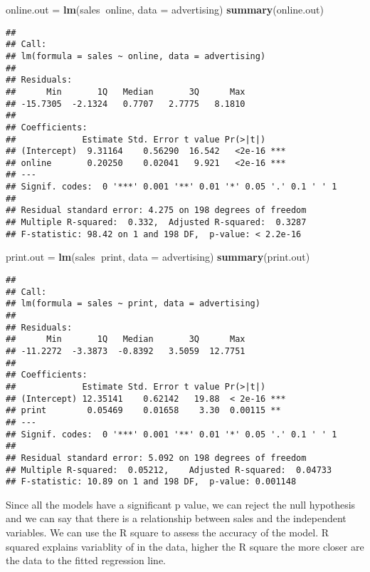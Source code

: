 \documentclass[
]{article}
\newenvironment{Shaded}{\begin{snugshade}}{\end{snugshade}}
\newcommand{\DataTypeTok}[1]{\textcolor[rgb]{0.13,0.29,0.53}{#1}}
\newcommand{\KeywordTok}[1]{\textcolor[rgb]{0.13,0.29,0.53}{\textbf{#1}}}
\newcommand{\NormalTok}[1]{#1}
\newcommand{\OperatorTok}[1]{\textcolor[rgb]{0.81,0.36,0.00}{\textbf{#1}}}
\newcommand{\StringTok}[1]{\textcolor[rgb]{0.31,0.60,0.02}{#1}}
\begin{document}
\begin{Shaded}
\begin{Highlighting}[]
\NormalTok{online.out =}\StringTok{ }\KeywordTok{lm}\NormalTok{(sales}\OperatorTok{~}\NormalTok{online, }\DataTypeTok{data =}\NormalTok{ advertising)}
\KeywordTok{summary}\NormalTok{(online.out)}
\end{Highlighting}
\end{Shaded}

\begin{verbatim}
## 
## Call:
## lm(formula = sales ~ online, data = advertising)
## 
## Residuals:
##      Min       1Q   Median       3Q      Max 
## -15.7305  -2.1324   0.7707   2.7775   8.1810 
## 
## Coefficients:
##             Estimate Std. Error t value Pr(>|t|)    
## (Intercept)  9.31164    0.56290  16.542   <2e-16 ***
## online       0.20250    0.02041   9.921   <2e-16 ***
## ---
## Signif. codes:  0 '***' 0.001 '**' 0.01 '*' 0.05 '.' 0.1 ' ' 1
## 
## Residual standard error: 4.275 on 198 degrees of freedom
## Multiple R-squared:  0.332,  Adjusted R-squared:  0.3287 
## F-statistic: 98.42 on 1 and 198 DF,  p-value: < 2.2e-16
\end{verbatim}

\begin{Shaded}
\begin{Highlighting}[]
\NormalTok{print.out =}\StringTok{ }\KeywordTok{lm}\NormalTok{(sales}\OperatorTok{~}\NormalTok{print, }\DataTypeTok{data =}\NormalTok{ advertising)}
\KeywordTok{summary}\NormalTok{(print.out)}
\end{Highlighting}
\end{Shaded}

\begin{verbatim}
## 
## Call:
## lm(formula = sales ~ print, data = advertising)
## 
## Residuals:
##      Min       1Q   Median       3Q      Max 
## -11.2272  -3.3873  -0.8392   3.5059  12.7751 
## 
## Coefficients:
##             Estimate Std. Error t value Pr(>|t|)    
## (Intercept) 12.35141    0.62142   19.88  < 2e-16 ***
## print        0.05469    0.01658    3.30  0.00115 ** 
## ---
## Signif. codes:  0 '***' 0.001 '**' 0.01 '*' 0.05 '.' 0.1 ' ' 1
## 
## Residual standard error: 5.092 on 198 degrees of freedom
## Multiple R-squared:  0.05212,    Adjusted R-squared:  0.04733 
## F-statistic: 10.89 on 1 and 198 DF,  p-value: 0.001148
\end{verbatim}

Since all the models have a significant p value, we can reject the null
hypothesis and we can say that there is a relationship between sales and
the independent variables. We can use the R square to assess the
accuracy of the model. R squared explains variablity of in the data,
higher the R square the more closer are the data to the fitted
regression line.
\end{document}
